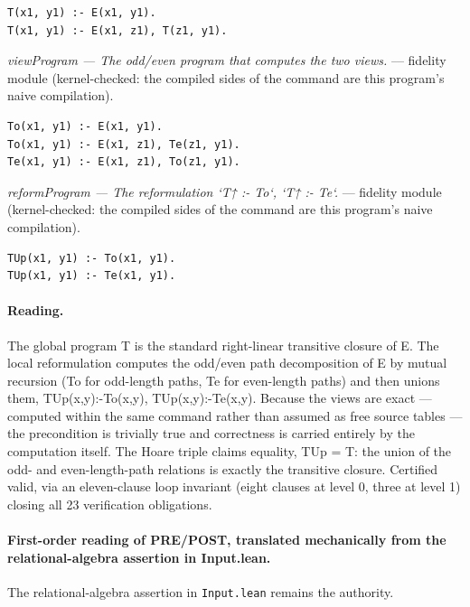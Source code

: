 \documentclass[10pt]{article}
\begin{document}
\begin{Verbatim}[fontsize=\scriptsize,breaklines=true,breakanywhere=true,frame=single,framesep=1.5mm]
T(x1, y1) :- E(x1, y1).
T(x1, y1) :- E(x1, z1), T(z1, y1).
\end{Verbatim}

{\raggedright\textit{viewProgram --- The odd/even program that computes the two views.} --- fidelity module (kernel-checked: the compiled sides of the command are this program's naive compilation).\par}

\begin{Verbatim}[fontsize=\scriptsize,breaklines=true,breakanywhere=true,frame=single,framesep=1.5mm]
To(x1, y1) :- E(x1, y1).
To(x1, y1) :- E(x1, z1), Te(z1, y1).
Te(x1, y1) :- E(x1, z1), To(z1, y1).
\end{Verbatim}

{\raggedright\textit{reformProgram --- The reformulation `T↑ :- To`, `T↑ :- Te`.} --- fidelity module (kernel-checked: the compiled sides of the command are this program's naive compilation).\par}

\begin{Verbatim}[fontsize=\scriptsize,breaklines=true,breakanywhere=true,frame=single,framesep=1.5mm]
TUp(x1, y1) :- To(x1, y1).
TUp(x1, y1) :- Te(x1, y1).
\end{Verbatim}

\paragraph{Reading.} The global program T is the standard right-linear transitive closure of E. The local reformulation computes the odd/even path decomposition of E by mutual recursion (To for odd-length paths, Te for even-length paths) and then unions them, TUp(x,y):-To(x,y), TUp(x,y):-Te(x,y). Because the views are exact --- computed within the same command rather than assumed as free source tables --- the precondition is trivially true and correctness is carried entirely by the computation itself. The Hoare triple claims equality, TUp = T: the union of the odd- and even-length-path relations is exactly the transitive closure. Certified valid, via an eleven-clause loop invariant (eight clauses at level 0, three at level 1) closing all 23 verification obligations.

\paragraph{First-order reading of PRE/POST, translated mechanically from the relational-algebra assertion in Input.lean.} The relational-algebra assertion in \texttt{Input.lean} remains the authority.
\end{document}
